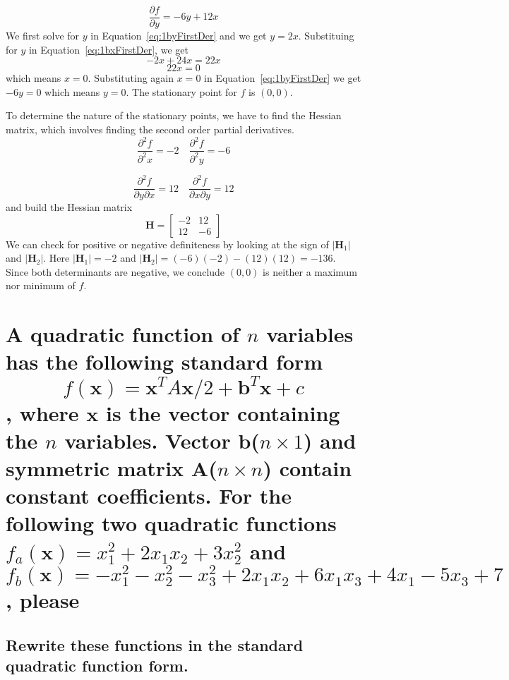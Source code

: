 \documentclass[11pt]{scrartcl}
\newcommand{\vect}{\boldsymbol}
\begin{document}
\begin{equation}
	\label{eq:1byFirstDer}
	\frac{\partial f}{\partial y} = -6y + 12x
\end{equation}
We first solve for $y$ in Equation~\ref{eq:1byFirstDer} and we get $y=2x$.
Substituing for $y$ in Equation~\ref{eq:1bxFirstDer}, we get 
$$-2x + 24x = 22x$$
$$22x = 0$$
which means $x=0$.
Substituting again $x=0$ in Equation~\ref{eq:1byFirstDer} we get $-6y=0$ which means
$y=0$.
The stationary point for $f$ is $(0, 0)$.

To determine the nature of the stationary points, we have to find the Hessian matrix,
which involves finding the second order partial derivatives.
\begin{equation}
	\frac{\partial^{2} f}{\partial^{2} x}=-2\quad \frac{\partial^{2}f}{\partial^{2}y} = -6
\end{equation}

\begin{equation}
	\frac{\partial^{2} f}{\partial y\partial x}=12\quad \frac{\partial^{2}f}{\partial x\partial y} = 12
\end{equation}
and build the Hessian matrix
$$
\boldsymbol{H} = 
\begin{bmatrix}
	-2 & 12\\
	12 & -6
\end{bmatrix}
$$
We can check for positive or negative definiteness by looking at the sign of $|\boldsymbol{H}_1|$ and $|\boldsymbol{H}_{2}|$.
Here $|\boldsymbol{H}_1| = -2$ and $|\boldsymbol{H}_2| = (-6)(-2) -(12)(12) = -136$.
Since both determinants are negative, we conclude $(0, 0)$ is neither a maximum nor minimum of $f$.

\section{A quadratic function of $n$ variables has the following standard form
		$$f(\vect{x}) = \vect{x}^{T}A\vect{x}/2 + \vect{b}^{T}\vect{x} +c$$, 
		where $\vect{x}$ is the vector containing the $n$ variables.
		Vector $\vect{b}$($n\times1$) and symmetric matrix $\vect{A}$($n\times n$) contain
		constant coefficients.
		For the following two quadratic functions $f_a (\vect{x})=x_{1}^{2}+2x_{1}x_{2}+3x_{2}^{2}$
		and $f_b (\vect{x})=-x_{1}^{2}-x_{2}^{2}-x_{3}^{2}+2x_{1}x_{2}+6x_{1}x_{3}+4x_{1}-5x_{3}+7$, please
}
\subsection{Rewrite these functions in the standard quadratic function form.}
\end{document}
